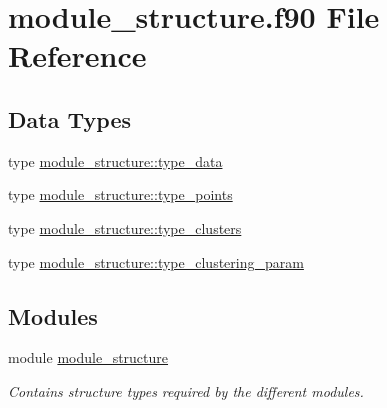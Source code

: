 \hypertarget{module__structure_8f90}{}\section{module\+\_\+structure.\+f90 File Reference}
\label{module__structure_8f90}
\subsection*{Data Types}
\begin{DoxyCompactItemize}
\item 
type \hyperlink{structmodule__structure_1_1type__data}{module\+\_\+structure\+::type\+\_\+data}
\item 
type \hyperlink{structmodule__structure_1_1type__points}{module\+\_\+structure\+::type\+\_\+points}
\item 
type \hyperlink{structmodule__structure_1_1type__clusters}{module\+\_\+structure\+::type\+\_\+clusters}
\item 
type \hyperlink{structmodule__structure_1_1type__clustering__param}{module\+\_\+structure\+::type\+\_\+clustering\+\_\+param}
\end{DoxyCompactItemize}
\subsection*{Modules}
\begin{DoxyCompactItemize}
\item 
module \hyperlink{namespacemodule__structure}{module\+\_\+structure}
\begin{DoxyCompactList}\small\item\em Contains structure types required by the different modules. \end{DoxyCompactList}\end{DoxyCompactItemize}
